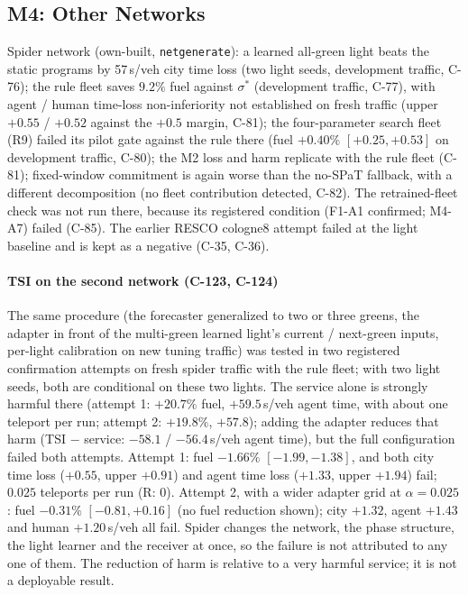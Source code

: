 \subsection{M4: Other Networks}\label{sec:m4}
Spider network (own-built, \texttt{netgenerate}): a learned all-green light beats the static programs by 57\,s/veh city time loss (two light seeds, development
traffic, C-76); the rule fleet saves $9.2\%$ fuel against $\sigma^*$ (development traffic, C-77), with agent / human time-loss non-inferiority not established on fresh traffic
(upper $+0.55$ / $+0.52$ against the $+0.5$ margin, C-81);
the four-parameter search fleet (R9) failed its pilot gate against the rule there (fuel $+0.40\%$ $[+0.25,+0.53]$ on development
traffic, C-80); the M2 loss and harm replicate with the rule fleet (C-81); fixed-window commitment is again worse than the
no-SPaT fallback, with a different decomposition (no fleet contribution detected, C-82). The retrained-fleet check was not run there, because its registered condition (F1-A1 confirmed; M4-A7) failed (C-85). The
earlier RESCO cologne8 attempt failed at the light baseline and is kept as a negative (C-35, C-36).
\paragraph{TSI on the second network (C-123, C-124)} The same procedure (the forecaster generalized to two or three greens, the adapter
in front of the multi-green learned light's current / next-green inputs, per-light calibration on new tuning traffic) was tested in two registered
confirmation attempts on fresh spider traffic with the rule fleet; with two light seeds, both are conditional on these two lights. The service alone is strongly harmful there (attempt 1: $+20.7\%$ fuel, $+59.5$\,s/veh agent time, with about one
teleport per run; attempt 2: $+19.8\%$, $+57.8$); adding the adapter reduces that harm (TSI $-$ service: $-58.1$ / $-56.4$\,s/veh agent time), but the full configuration failed both attempts. Attempt 1: fuel $-1.66\%$
$[-1.99,-1.38]$, and both city time loss ($+0.55$, upper $+0.91$) and agent time loss ($+1.33$, upper $+1.94$) fail; $0.025$ teleports per
run (R: 0). Attempt 2, with a wider adapter grid at $\alpha=0.025$: fuel $-0.31\%$ $[-0.81,+0.16]$ (no fuel reduction shown); city $+1.32$,
agent $+1.43$ and human $+1.20$\,s/veh all fail. Spider changes the network, the phase structure, the light learner and the receiver at
once, so the failure is not attributed to any one of them. The reduction of harm is relative to a very harmful service; it is not a
deployable result.
